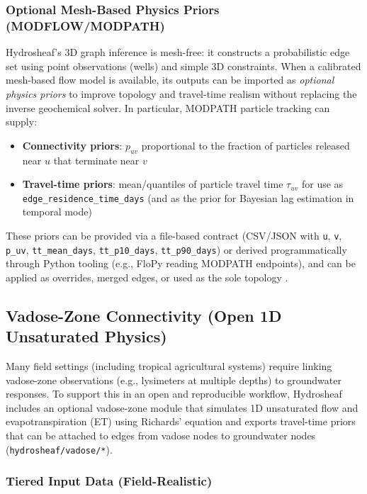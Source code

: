 \documentclass[12pt,a4paper]{article}
\theoremstyle{plain}
\theoremstyle{definition}
\theoremstyle{remark}
\begin{document}
\subsubsection{Optional Mesh-Based Physics Priors (MODFLOW/MODPATH)}

Hydrosheaf's 3D graph inference is mesh-free: it constructs a probabilistic edge set using point observations (wells) and simple 3D constraints. When a calibrated mesh-based flow model is available, its outputs can be imported as \textit{optional physics priors} to improve topology and travel-time realism without replacing the inverse geochemical solver. In particular, MODPATH particle tracking can supply:
\begin{itemize}
	\item \textbf{Connectivity priors}: $p_{uv}$ proportional to the fraction of particles released near $u$ that terminate near $v$
	\item \textbf{Travel-time priors}: mean/quantiles of particle travel time $\tau_{uv}$ for use as \texttt{edge\_residence\_time\_days} (and as the prior for Bayesian lag estimation in temporal mode)
\end{itemize}
These priors can be provided via a file-based contract (CSV/JSON with \texttt{u}, \texttt{v}, \texttt{p\_uv}, \texttt{tt\_mean\_days}, \texttt{tt\_p10\_days}, \texttt{tt\_p90\_days}) or derived programmatically through Python tooling (e.g., FloPy reading MODPATH endpoints), and can be applied as overrides, merged edges, or used as the sole topology \cite{harbaugh2005, pollock2016, bakker2016}.

\subsection{Vadose-Zone Connectivity (Open 1D Unsaturated Physics)}

Many field settings (including tropical agricultural systems) require linking vadose-zone observations (e.g., lysimeters at multiple depths) to groundwater responses. To support this in an open and reproducible workflow, Hydrosheaf includes an optional vadose-zone module that simulates 1D unsaturated flow and evapotranspiration (ET) using Richards' equation and exports travel-time priors that can be attached to edges from vadose nodes to groundwater nodes (\nolinkurl{hydrosheaf/vadose/*}).

\subsubsection{Tiered Input Data (Field-Realistic)}
\end{document}
